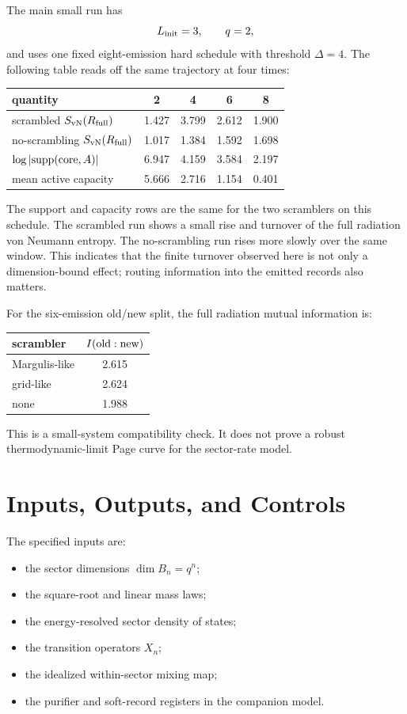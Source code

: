 \documentclass[aps,prd,onecolumn,longbibliography,nofootinbib]{revtex4-2}
\newcommand{\Svn}{S_{\rm vN}}
\begin{document}
The main small run has
\begin{equation}
    L_{\rm init}=3,\qquad q=2,
\end{equation}
and uses one fixed eight-emission hard schedule with threshold $\Delta=4$.
The following table reads off the same trajectory at four times:
\begin{center}
\begin{tabular}{lcccc}
\toprule
quantity & 2 & 4 & 6 & 8\\
\midrule
scrambled $\Svn(R_{\rm full})$ & 1.427 & 3.799 & 2.612 & 1.900\\
no-scrambling $\Svn(R_{\rm full})$ & 1.017 & 1.384 & 1.592 & 1.698\\
$\log|\mathrm{supp}({\rm core},A)|$ & 6.947 & 4.159 & 3.584 & 2.197\\
mean active capacity & 5.666 & 2.716 & 1.154 & 0.401\\
\bottomrule
\end{tabular}
\end{center}
The support and capacity rows are the same for the two scramblers on this
schedule.  The scrambled run shows a small rise and turnover of the full
radiation von Neumann entropy.  The no-scrambling run rises more slowly over
the same window.  This indicates that the finite turnover observed here is not
only a dimension-bound effect; routing information into the emitted records
also matters.

For the six-emission old/new split, the full radiation mutual information is:
\begin{center}
\begin{tabular}{lc}
\toprule
scrambler & $I({\rm old}:{\rm new})$\\
\midrule
Margulis-like & 2.615\\
grid-like     & 2.624\\
none          & 1.988\\
\bottomrule
\end{tabular}
\end{center}
This is a small-system compatibility check.  It does not prove a robust
thermodynamic-limit Page curve for the sector-rate model.

\section{Inputs, Outputs, and Controls}
\label{sec:accounting}

The specified inputs are:
\begin{itemize}[leftmargin=*]
    \item the sector dimensions $\dim B_n=q^n$;
    \item the square-root and linear mass laws;
    \item the energy-resolved sector density of states;
    \item the transition operators $X_n$;
    \item the idealized within-sector mixing map;
    \item the purifier and soft-record registers in the companion model.
\end{itemize}
\end{document}
